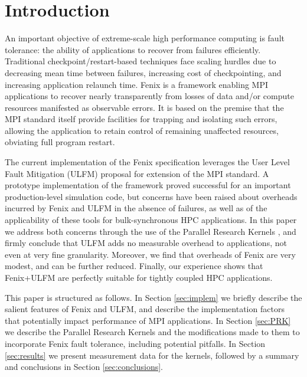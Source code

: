 \section{Introduction}
An important objective of extreme-scale high performance computing is fault tolerance:
the ability of applications to recover from failures efficiently.
Traditional checkpoint/restart-based techniques face scaling hurdles due to decreasing
mean time between failures, increasing cost of checkpointing, and 
increasing application relaunch time.
Fenix is a framework enabling MPI applications to recover nearly transparently from 
losses of data and/or compute resources manifested as observable errors.
It is based on the premise that the MPI standard itself provide facilities for trapping
and isolating such errors, allowing the application to retain control of remaining unaffected
resources, obviating full program restart.

The current implementation of the Fenix specification \cite{fenixspec} leverages
the  User Level Fault Mitigation (ULFM) \cite{bland2013post} proposal for extension
of the MPI standard.
A prototype implementation of the framework \cite{Gamell:2014} proved successful for
an important production-level simulation code, but concerns have been raised about
overheads incurred by Fenix and ULFM in the absence of failures, as well as of the
applicability of these tools for bulk-synchronous HPC applications.
In this paper we address both concerns through the use of the Parallel Research Kernels
\cite{van2016comparing}, and firmly conclude that ULFM adds no measurable
overhead to applications, not even at very fine granularity.
Moreover, we find that overheads of Fenix are very modest, and can be further reduced.
Finally, our experience shows that Fenix+ULFM are perfectly suitable for tightly coupled
HPC applications.

This paper is structured as follows.
In Section \ref{sec:implem} we briefly describe the salient features of Fenix and ULFM,
and describe the implementation factors that potentially impact performance of MPI applications.
In Section \ref{sec:PRK} we describe the Parallel Research Kernels and the modifications
made to them to incorporate Fenix fault tolerance, including potential pitfalls.
In Section \ref{sec:results} we present measurement data for the kernels,
followed by a summary and conclusions in Section \ref{sec:conclusions}.
